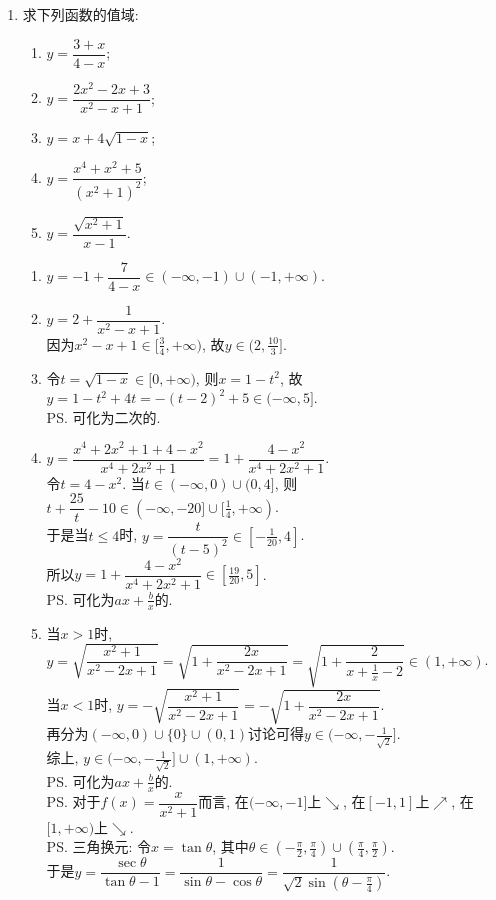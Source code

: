 \begin{enumerate}
\item 求下列函数的值域: 
\begin{enumerate}
\item $y=\dfrac{3+x}{4-x}$; 
\item $y=\dfrac{2x^2-2x+3}{x^2-x+1}$; 
\item $y=x+4\sqrt{1-x}$; 
\item $y=\dfrac{x^4+x^2+5}{(x^2+1)^2}$; 
\item $y=\dfrac{\sqrt{x^2+1}}{x-1}$. 
\end{enumerate}
\begin{jieda}
\begin{enumerate}
\item $y=-1+\dfrac{7}{4-x}\in(-\infty,-1)\cup(-1,+\infty)$. 

\item $y=2+\dfrac{1}{x^2-x+1}$. \\
因为$x^2-x+1\in[\frac{3}{4},+\infty)$, 故$y\in(2,\frac{10}{3}]$. 

\item 令$t=\sqrt{1-x}\in[0,+\infty)$, 则$x=1-t^2$, 故$y=1-t^2+4t=-(t-2)^2+5\in(-\infty,5]$. \\
\ps 可化为二次的. 

\item $y=\dfrac{x^4+2x^2+1+4-x^2}{x^4+2x^2+1}=1+\dfrac{4-x^2}{x^4+2x^2+1}$. \\
令$t=4-x^2$. 当$t\in(-\infty,0)\cup(0,4]$, 则$t+\dfrac{25}{t}-10\in(-\infty,-20]\cup[\frac{1}{4},+\infty)$. \\
于是当$t\leq 4$时, $y=\dfrac{t}{(t-5)^2}\in[-\frac{1}{20},4]$. \\
所以$y=1+\dfrac{4-x^2}{x^4+2x^2+1}\in[\frac{19}{20},5]$. \\
\ps 可化为$ax+\frac{b}{x}$的. 

\item 当$x>1$时, $y=\sqrt{\dfrac{x^2+1}{x^2-2x+1}}=\sqrt{1+\dfrac{2x}{x^2-2x+1}}=\sqrt{1+\dfrac{2}{x+\frac{1}{x}-2}}\in(1,+\infty)$. \\
当$x<1$时, $y=-\sqrt{\dfrac{x^2+1}{x^2-2x+1}}=-\sqrt{1+\dfrac{2x}{x^2-2x+1}}$. \\
再分为$(-\infty,0)\cup\{0\}\cup(0,1)$讨论可得$y\in(-\infty,-\frac{1}{\sqrt{2}}]$. \\
综上, $y\in(-\infty,-\frac{1}{\sqrt{2}}]\cup(1,+\infty)$. \\
\ps 可化为$ax+\frac{b}{x}$的. \\
\ps 对于$f(x)=\dfrac{x}{x^2+1}$而言, 在$(-\infty,-1]$上$\searrow$, 在$[-1,1]$上$\nearrow$, 在$[1,+\infty)$上$\searrow$. \\
\ps 三角换元: 令$x=\tan\theta$, 其中$\theta\in(-\frac{\pi}{2},\frac{\pi}{4})\cup(\frac{\pi}{4},\frac{\pi}{2})$. \\
于是$y=\dfrac{\sec\theta}{\tan\theta-1}=\dfrac{1}{\sin\theta-\cos\theta}=\dfrac{1}{\sqrt{2}\sin(\theta-\frac{\pi}{4})}$. %
\end{enumerate}
\end{jieda}
\begin{vspace_}
\vsp[5]
\end{vspace_}



\end{enumerate}
